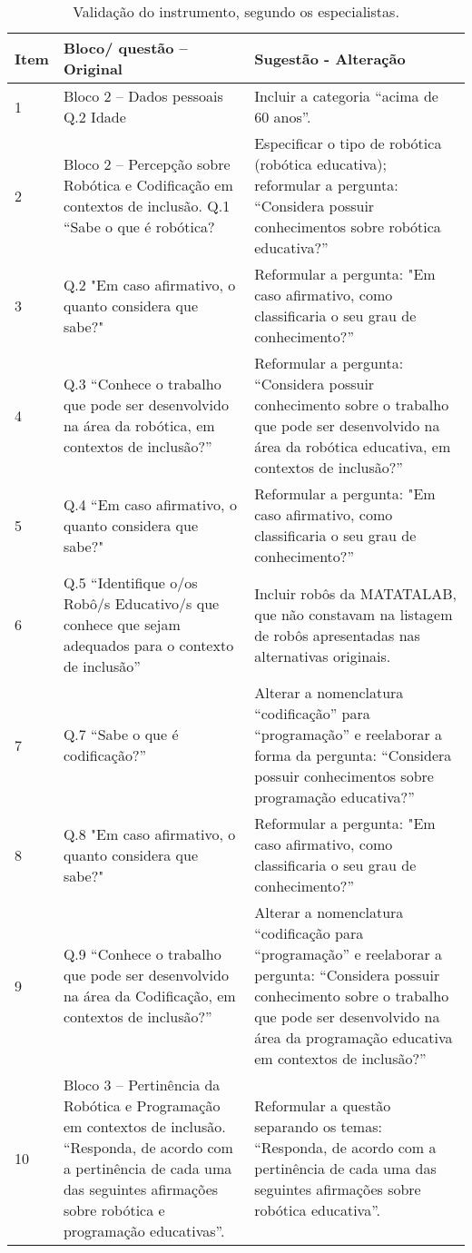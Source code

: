 \documentclass[portuguese]{textolivre}
\begin{document}
\begin{table}[h!]
\centering
\begin{threeparttable}
\caption{Validação do instrumento, segundo os especialistas.}
\begin{small}
\label{tab03}
\begin{tabular}{p{0.5cm} >{\raggedright\arraybackslash}p{4.5cm} >{\raggedright\arraybackslash}p{6cm}}
\toprule
Item & Bloco/ questão – Original & Sugestão - Alteração \\
 \midrule
1 & Bloco 2 – Dados pessoais Q.2 Idade & Incluir a categoria “acima de 60 anos”. \\
2 & Bloco 2 – Percepção sobre Robótica e Codificação em contextos de inclusão. Q.1 “Sabe o que é robótica? & Especificar o tipo de robótica (robótica educativa); reformular a pergunta: “Considera possuir conhecimentos sobre robótica educativa?” \\
3 & Q.2 "Em caso afirmativo, o quanto considera que sabe?" & Reformular a pergunta: "Em caso afirmativo, como classificaria o seu grau de conhecimento?” \\
4 & Q.3 “Conhece o trabalho que pode ser desenvolvido na área da robótica, em contextos de inclusão?” & Reformular a pergunta: “Considera possuir conhecimento sobre o trabalho que pode ser desenvolvido na área da robótica educativa, em contextos de inclusão?” \\
5 & Q.4 “Em caso afirmativo, o quanto considera que sabe?" & Reformular a pergunta: "Em caso afirmativo, como classificaria o seu grau de conhecimento?” \\
6 & Q.5 “Identifique o/os Robô/s Educativo/s que conhece que sejam adequados para o contexto de inclusão” & Incluir robôs da MATATALAB, que não constavam na listagem de robôs apresentadas nas alternativas originais. \\
7 & Q.7 “Sabe o que é codificação?” & Alterar a nomenclatura “codificação” para “programação” e reelaborar a forma da pergunta: “Considera possuir conhecimentos sobre programação educativa?” \\
8 & Q.8 "Em caso afirmativo, o quanto considera que sabe?" & Reformular a pergunta: "Em caso afirmativo, como classificaria o seu grau de  conhecimento?” \\
9 & Q.9 “Conhece o trabalho que pode ser desenvolvido na área da Codificação, em contextos de inclusão?” & Alterar a nomenclatura “codificação para “programação” e reelaborar a pergunta: “Considera possuir conhecimento sobre o trabalho que pode ser desenvolvido na área da programação educativa em contextos de inclusão?” \\
10 & Bloco 3 – Pertinência da Robótica e Programação em contextos de inclusão. “Responda, de acordo com a pertinência de cada uma das seguintes afirmações sobre robótica e programação educativas”. & Reformular a questão separando os temas: “Responda, de acordo com a pertinência de cada uma das seguintes afirmações sobre robótica educativa”. 


\end{tabular}
\end{small}
\end{threeparttable}
\end{table}
\end{document}
